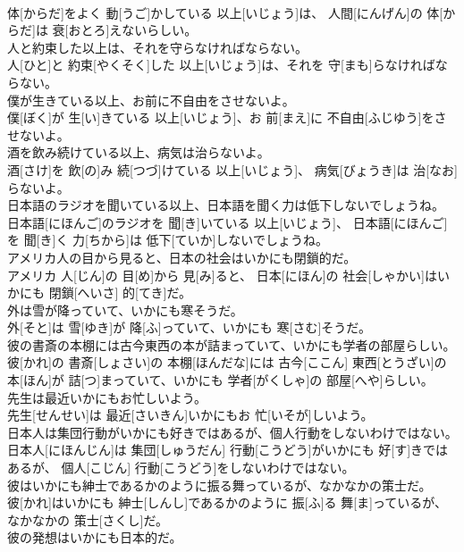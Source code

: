 \documentclass[8pt]{extreport}
\begin{document}
\begin{CJK}{UTF8}{min}
\\	体[からだ]をよく 動[うご]かしている 以上[いじょう]は、 人間[にんげん]の 体[からだ]は 衰[おとろ]えないらしい。
\\	人と約束した以上は、それを守らなければならない。	
\\	人[ひと]と 約束[やくそく]した 以上[いじょう]は、それを 守[まも]らなければならない。
\\	僕が生きている以上、お前に不自由をさせないよ。	
\\	僕[ぼく]が 生[い]きている 以上[いじょう]、お 前[まえ]に 不自由[ふじゆう]をさせないよ。
\\	酒を飲み続けている以上、病気は治らないよ。	
\\	酒[さけ]を 飲[の]み 続[つづ]けている 以上[いじょう]、 病気[びょうき]は 治[なお]らないよ。
\\	日本語のラジオを聞いている以上、日本語を聞く力は低下しないでしょうね。	
\\	日本語[にほんご]のラジオを 聞[き]いている 以上[いじょう]、 日本語[にほんご]を 聞[き]く 力[ちから]は 低下[ていか]しないでしょうね。
\\	アメリカ人の目から見ると、日本の社会はいかにも閉鎖的だ。	
\\	アメリカ 人[じん]の 目[め]から 見[み]ると、 日本[にほん]の 社会[しゃかい]はいかにも 閉鎖[へいさ] 的[てき]だ。
\\	外は雪が降っていて、いかにも寒そうだ。	
\\	外[そと]は 雪[ゆき]が 降[ふ]っていて、いかにも 寒[さむ]そうだ。
\\	彼の書斎の本棚には古今東西の本が詰まっていて、いかにも学者の部屋らしい。	
\\	彼[かれ]の 書斎[しょさい]の 本棚[ほんだな]には 古今[ここん] 東西[とうざい]の 本[ほん]が 詰[つ]まっていて、いかにも 学者[がくしゃ]の 部屋[へや]らしい。
\\	先生は最近いかにもお忙しいよう。	
\\	先生[せんせい]は 最近[さいきん]いかにもお 忙[いそが]しいよう。
\\	日本人は集団行動がいかにも好きではあるが、個人行動をしないわけではない。	
\\	日本人[にほんじん]は 集団[しゅうだん] 行動[こうどう]がいかにも 好[す]きではあるが、 個人[こじん] 行動[こうどう]をしないわけではない。
\\	彼はいかにも紳士であるかのように振る舞っているが、なかなかの策士だ。	
\\	彼[かれ]はいかにも 紳士[しんし]であるかのように 振[ふ]る 舞[ま]っているが、なかなかの 策士[さくし]だ。
\\	彼の発想はいかにも日本的だ。	

\end{CJK}
\end{document}
